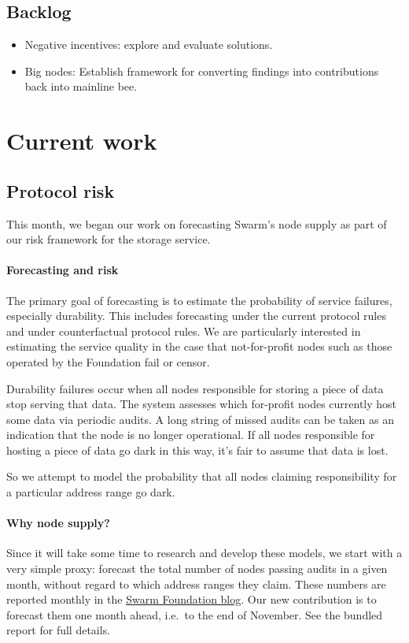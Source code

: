 \subsection*{Backlog}
\begin{itemize}
  \item Negative incentives: explore and evaluate solutions.
  \item Big nodes: Establish framework for converting findings into contributions back into mainline bee.
\end{itemize}

\newpage
\section*{Current work}

\subsection*{Protocol risk}

This month, we began our work on forecasting Swarm's node supply as part of our risk framework for the storage service.

\paragraph{Forecasting and risk}
%
The primary goal of forecasting is to estimate the probability of service failures, especially durability.
%
This includes forecasting under the current protocol rules and under counterfactual protocol rules.
%
We are particularly interested in estimating the service quality in the case that not-for-profit nodes such as those operated by the Foundation fail or censor.

Durability failures occur when all nodes responsible for storing a piece of data stop serving that data.
%
The system assesses which for-profit nodes currently host some data via periodic audits.
%
A long string of missed audits can be taken as an indication that the node is no longer operational.
%
If all nodes responsible for hosting a piece of data go dark in this way, it's fair to assume that data is lost.

So we attempt to model the probability that all nodes claiming responsibility for a particular address range go dark.

\paragraph{Why node supply?}     
%
Since it will take some time to research and develop these models, we start with a very simple proxy: forecast the total number of nodes passing audits in a given month, without regard to which address ranges they claim.
%
These numbers are reported monthly in the \href{https://www.ethswarm.org/blog/2026/swarm-state-of-the-network-september-2026/}{Swarm Foundation blog}.
%
Our new contribution is to forecast them one month ahead, i.e.~to the end of November.
%
See the bundled report for full details.

